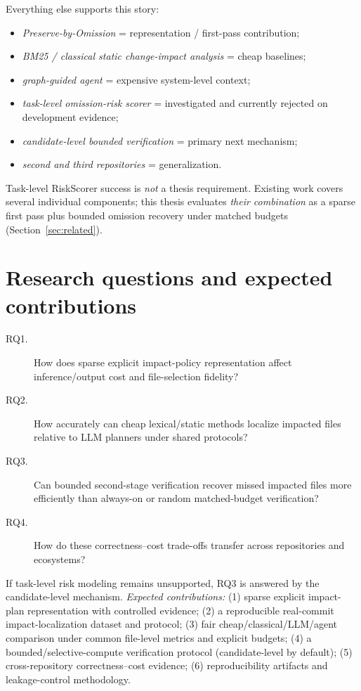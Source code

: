 \documentclass[11pt,a4paper]{article}
\begin{document}
Everything else supports this story:
\begin{itemize}
  \item \emph{Preserve-by-Omission} = representation / first-pass contribution;
  \item \emph{BM25 / classical static change-impact analysis} = cheap baselines;
  \item \emph{graph-guided agent} = expensive system-level context;
  \item \emph{task-level omission-risk scorer} = investigated and currently
        rejected on development evidence;
  \item \emph{candidate-level bounded verification} = primary next mechanism;
  \item \emph{second and third repositories} = generalization.
\end{itemize}

Task-level RiskScorer success is \emph{not} a thesis requirement. Existing work
covers several individual components; this thesis evaluates \emph{their
combination} as a sparse first pass plus bounded omission recovery under
matched budgets (Section~\ref{sec:related}).

\section{Research questions and expected contributions}
\label{sec:rq}

\begin{description}
  \item[RQ1.] How does sparse explicit impact-policy representation affect
  inference/output cost and file-selection fidelity?
  \item[RQ2.] How accurately can cheap lexical/static methods localize impacted
  files relative to LLM planners under shared protocols?
  \item[RQ3.] Can bounded second-stage verification recover missed impacted
  files more efficiently than always-on or random matched-budget verification?
  \item[RQ4.] How do these correctness--cost trade-offs transfer across
  repositories and ecosystems?
\end{description}

If task-level risk modeling remains unsupported, RQ3 is answered by the
candidate-level mechanism. \emph{Expected contributions:}
(1) sparse explicit impact-plan representation with controlled evidence;
(2) a reproducible real-commit impact-localization dataset and protocol;
(3) fair cheap/classical/LLM/agent comparison under common file-level metrics
and explicit budgets;
(4) a bounded/selective-compute verification protocol (candidate-level by
default);
(5) cross-repository correctness--cost evidence;
(6) reproducibility artifacts and leakage-control methodology.
\end{document}
